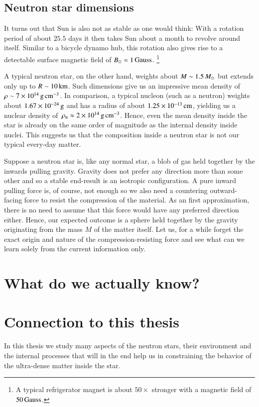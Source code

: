 \subsection{Neutron star dimensions}
It turns out that Sun is also not as stable as one would think:
With a rotation period of about $25.5$ days it then takes Sun about a month to revolve around itself.
Similar to a bicycle dynamo hub, this rotation also gives rise to a detectable surface magnetic field of $B_{\odot} \approx 1 \, \mathrm{Gauss}$.%
\footnote{A typical refrigerator magnet is about $50\times$ stronger with a magnetic field of $50\, \mathrm{Gauss}$.}

A typical neutron star, on the other hand, weights about $M \sim 1.5\, M_{\odot}$ but extends only up to $R \sim 10\, \mathrm{km}$.
Such dimensions give us an impressive mean density of $\rho \sim 7 \times 10^{14} \, \mathrm{g}\,\mathrm{cm}^{-3} $.
In comparison, a typical nucleon (such as a neutron) weights about $1.67 \times 10^{-24} \, \mathrm{g}$ and has a radius of about $1.25 \times 10^{-13} \, \mathrm{cm}$, yielding us a nuclear density of $\, \rho_{\mathrm{n}}  \approx 2 \times 10^{14} \, \mathrm{g}\,\mathrm{cm}^{-3} $.
Hence, even the mean density inside the star is already on the same order of magnitude as the internal density inside nuclei.
This suggests us that the composition inside a neutron star is not our typical every-day matter.


Suppose a neutron star is, like any normal star, a blob of gas held together by the inwards pulling gravity.
Gravity does not prefer any direction more than some other and so a stable end-result is an isotropic configuration.
A pure inward pulling force is, of course, not enough so we also need a countering outward-facing force to resist the compression of the material.
As an first approximation, there is no need to assume that this force would have any preferred direction either.
Hence, our expected outcome is a sphere held together by the gravity originating from the mass $M$ of the matter itself.
Let us, for a while forget the exact origin and nature of the compression-resisting force and see what can we learn solely from the current information only.

\section{What do we actually know?}


%
%


\section{Connection to this thesis}
In this thesis we study many aspects of the neutron stars, their environment and the internal processes that will in the end help us in constraining the behavior of the ultra-dense matter inside the star.

